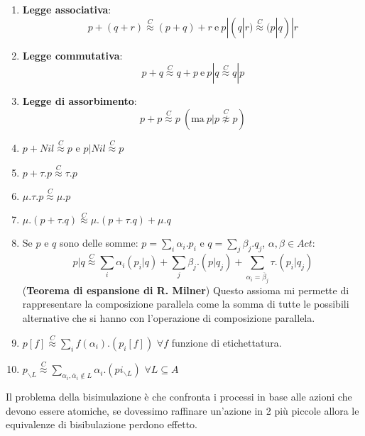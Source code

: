 \begin{enumerate}
    \item \textbf{Legge associativa}:
          \begin{equation}
              p + (q + r) \stackrel{C}{\approx} (p + q) + r \ \text{e} \ p | (q | r)
              \stackrel{C}{\approx} (p | q) | r
          \end{equation}
    \item \textbf{Legge commutativa}:
          \begin{equation}
              p + q \stackrel{C}{\approx} q + p \ \text{e} \ p | q
              \stackrel{C}{\approx} q | p
          \end{equation}
    \item \textbf{Legge di assorbimento}:
          \begin{equation}
              p + p \stackrel{C}{\approx} p \ (\text{ma} \ p | p
              \stackrel{C}{\not\approx} p)
          \end{equation}
    \item $p + Nil \stackrel{C}{\approx} p$ e $p | Nil \stackrel{C}{\approx} p$
    \item $p + \tau . p \stackrel{C}{\approx} \tau . p$
    \item $\mu . \tau . p \stackrel{C}{\approx} \mu . p$
    \item $\mu . (p + \tau . q) \stackrel{C}{\approx} \mu . (p +
              \tau . q) + \mu . q$
    \item Se $p$ e $q$ sono delle somme: $p = \sum_{i} \alpha_i . p_i$ e
          $q = \sum_{j} \beta_j . q_j$,  $\alpha, \beta \in Act$:
          $$p | q \stackrel{C}{\approx} \sum_{i} \alpha_i (p_{i} | q) + \sum_{j}
              \beta_{j} . (p|q_{j}) + \sum_{\alpha_i = \overline{\beta}_{j}}
              \tau . (p_{i} | q_{j})$$
          (\textbf{Teorema di espansione di R. Milner}) Questo assioma mi permette
          di rappresentare la composizione parallela come la somma di tutte le
          possibili alternative che si hanno con l'operazione di composizione
          parallela.
    \item $p[f] \stackrel{C}{\approx} \sum_{i} f(\alpha_i) . (p_{i} [f])$ $\forall f$
          funzione di etichettatura.
    \item $p_{\backslash L} \stackrel{C}{\approx} \sum_{\alpha_i,\overline{\alpha}_i
                  \not\in L} \alpha_i . (pi_{\backslash L})$ $\forall L \subseteq A$
\end{enumerate}
Il problema della bisimulazione è che confronta i processi in base alle azioni che
devono essere atomiche, se dovessimo raffinare un'azione in 2 più piccole allora
le equivalenze di bisibulazione perdono effetto.

